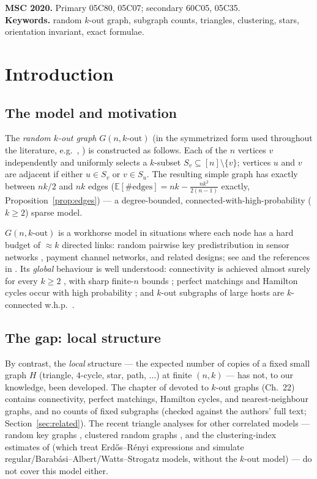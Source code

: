 \documentclass[11pt,a4paper]{article}
\theoremstyle{definition}
\theoremstyle{definition}
\begin{document}
\noindent\textbf{MSC 2020.} Primary 05C80, 05C07; secondary 60C05, 05C35.\\
\textbf{Keywords.} random $k$-out graph, subgraph counts, triangles, clustering,
stars, orientation invariant, exact formulae.

\section{Introduction}
\subsection{The model and motivation}

The \emph{random $k$-out graph} $G(n,k\text{-out})$ (in the symmetrized form used
throughout the literature, e.g.\
\cite[Ch.~22]{friezeKaronski2015}, \cite{soodYagan2020}) is constructed as follows.
Each of the $n$ vertices $v$ independently and uniformly selects a $k$-subset
$S_v\subseteq [n]\setminus\{v\}$; vertices $u$ and $v$ are adjacent if either
$u\in S_v$ or $v\in S_u$. The resulting simple graph has exactly between $nk/2$ and
$nk$ edges ($\mathbb E[\# \text{edges}] = nk - \tfrac{nk^2}{2(n-1)}$ exactly,
Proposition~\ref{prop:edges}) — a degree-bounded, connected-with-high-probability
($k\ge 2$) sparse model.

$G(n,k\text{-out})$ is a workhorse model in situations where each node has a hard
budget of $\approx k$ directed links: random pairwise key predistribution in sensor
networks \cite{eschenauerGligor2002,yaganMakowski2009,soodYagan2020}, payment channel
networks, and related designs; see \cite{elumarSoodYagan2023} and the references in
\cite{soodYagan2020}. Its \emph{global} behaviour is well understood: connectivity is
achieved almost surely for every $k\ge2$
\cite{fennerFrieze1982,friezeKaronski2015}, with sharp finite-$n$ bounds
\cite{soodYagan2020}; perfect matchings and Hamilton cycles occur
with high probability \cite[Ch.~22]{friezeKaronski2015}; and $k$-out
subgraphs of large hosts are $k$-connected w.h.p.\
\cite{friezeJohansson2014}.

\subsection{The gap: local structure}
By contrast, the \emph{local} structure — the expected number of copies of a fixed
small graph $H$ (triangle, $4$-cycle, star, path, $\dots$) at finite $(n,k)$ — has
not, to our knowledge, been developed. The chapter of \cite{friezeKaronski2015}
devoted to $k$-out graphs (Ch.~22) contains connectivity, perfect matchings,
Hamilton cycles, and nearest-neighbour graphs, and no counts of fixed subgraphs
(checked against the authors' full text; Section~\ref{sec:related}). The recent
triangle analyses for other correlated models — random key graphs
\cite{yaganMakowski2009,yaganMakowski2017}, clustered random graphs
\cite{newman2009}, and the clustering-index estimates of
\cite{islakYesiloglu2024} (which treat Erd\H os--R\'enyi expressions and simulate
regular/Barab\'asi--Albert/Watts--Strogatz models, without the $k$-out model) — do
not cover this model either.
\end{document}
